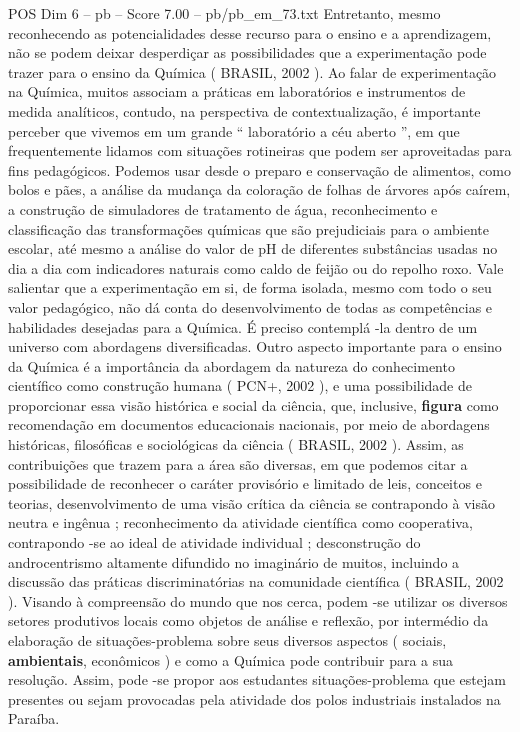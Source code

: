 \begin{textsample}{POS Dim 6 – pb – Score 7.00 – pb/pb\_em\_73.txt}
Entretanto, mesmo reconhecendo as potencialidades desse recurso para o ensino e a aprendizagem, não se podem deixar desperdiçar as possibilidades que a experimentação pode trazer para o ensino da Química ( BRASIL, 2002 ).
Ao falar de experimentação na Química, muitos associam a práticas em laboratórios e instrumentos de medida analíticos, contudo, na perspectiva de contextualização, é importante perceber que vivemos em um grande “ laboratório a céu aberto ”, em que frequentemente lidamos com situações rotineiras que podem ser aproveitadas para fins pedagógicos.
Podemos usar desde o preparo e conservação de alimentos, como bolos e pães, a análise da mudança da coloração de folhas de árvores após caírem, a construção de simuladores de tratamento de água, reconhecimento e classificação das transformações químicas que são prejudiciais para o ambiente escolar, até mesmo a análise do valor de pH de diferentes substâncias usadas no dia a dia com indicadores naturais como caldo de feijão ou do repolho roxo.
Vale salientar que a experimentação em si, de forma isolada, mesmo com todo o seu valor pedagógico, não dá conta do desenvolvimento de todas as competências e habilidades desejadas para a Química.
É preciso contemplá -la dentro de um universo com abordagens diversificadas.
Outro aspecto importante para o ensino da Química é a importância da abordagem da natureza do conhecimento científico como construção humana ( PCN+, 2002 ), e uma possibilidade de proporcionar essa visão histórica e social da ciência, que, inclusive, \textbf{figura} como recomendação em documentos educacionais nacionais, por meio de abordagens históricas, filosóficas e sociológicas da ciência ( BRASIL, 2002 ).
Assim, as contribuições que trazem para a área são diversas, em que podemos citar a possibilidade de reconhecer o caráter provisório e limitado de leis, conceitos e teorias, desenvolvimento de uma visão crítica da ciência se contrapondo à visão neutra e ingênua ; reconhecimento da atividade científica como cooperativa, contrapondo -se ao ideal de atividade individual ; desconstrução do androcentrismo altamente difundido no imaginário de muitos, incluindo a discussão das práticas discriminatórias na comunidade científica ( BRASIL, 2002 ).
Visando à compreensão do mundo que nos cerca, podem -se utilizar os diversos setores produtivos locais como objetos de análise e reflexão, por intermédio da elaboração de situações-problema sobre seus diversos aspectos ( sociais, \textbf{ambientais}, econômicos ) e como a Química pode contribuir para a sua resolução.
Assim, pode -se propor aos estudantes situações-problema que estejam presentes ou sejam provocadas pela atividade dos polos industriais instalados na Paraíba.

\end{textsample}
